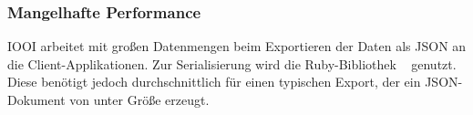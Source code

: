 \subsubsection{Mangelhafte Performance}
\label{sssec:epv_ungenuegende_performance}

IOOI arbeitet mit großen Datenmengen beim Exportieren der Daten als JSON an die
Client-Applikationen.  Zur Serialisierung wird die Ruby-Bibliothek
~\cite{ams} genutzt.  Diese benötigt jedoch
durchschnittlich  für einen typischen Export, der ein JSON-Dokument von
unter  Größe erzeugt.
